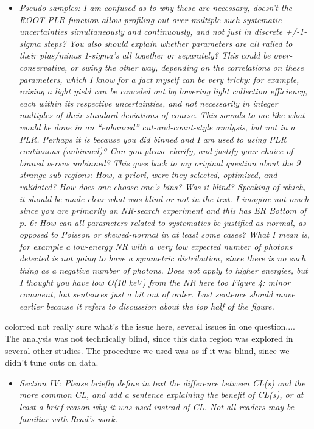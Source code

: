 \documentclass{article}
\begin{document}
\begin{itemize}
	\item \em{Pseudo-samples: I am confused as to why these are necessary, doesn’t
the ROOT PLR function allow profiling out over multiple such
systematic uncertainties simultaneously and continuously, and not just
in discrete +/-1-sigma steps? You also should explain whether
parameters are all railed to their plus/minus 1-sigma’s all together
or separately? This could be over-conservative, or swing the other
way, depending on the correlations on these parameters, which I know
for a fact myself can be very tricky: for example, raising a light
yield can be canceled out by lowering light collection efficiency,
each within its respective uncertainties, and not necessarily in
integer multiples of their standard deviations of course. This sounds
to me like what would be done in an “enhanced” cut-and-count-style
analysis, but not in a PLR. Perhaps it is because you did binned and I
am used to using PLR continuous (unbinned)? Can you please clarify,
and justify your choice of binned versus unbinned? This goes back to
my original question about the 9 strange sub-regions: How, a priori,
were they selected, optimized, and validated? How does one choose
one’s bins? Was it blind? Speaking of which, it should be made clear
what was blind or not in the text. I imagine not much since you are
primarily an NR-search experiment and this has ER Bottom of p. 6: How
can all parameters related to systematics be justified as normal, as
opposed to Poisson or skewed-normal in at least some cases? What I
mean is, for example a low-energy NR with a very low expected number
of photons detected is not going to have a symmetric distribution,
since there is no such thing as a negative number of photons. Does not
apply to higher energies, but I thought you have low O(10 keV) from
the NR here too Figure 4: minor comment, but sentences just a bit out
of order. Last sentence should move earlier because it refers to
discussion about the top half of the figure.}
\end{itemize}

{color{red} not really sure what's the issue here, several issues in one question....}
The analysis was not technically blind, since this data region was explored in several 
other studies. The procedure we used was as if it was blind, since we didn't tune cuts on data.


\begin{itemize}
	\item \em{Section IV: Please briefly define in text the difference between CL(s)
and the more common CL, and add a sentence explaining the benefit of
CL(s), or at least a brief reason why it was used instead of CL. Not
all readers may be familiar with Read’s work.}
\end{itemize}
\end{document}
